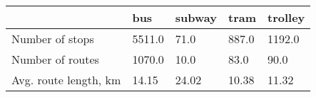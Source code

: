 \begin{tabular}{lllll}
\toprule
{} &     bus & subway &   tram & trolley \\
\midrule
Number of stops       &  5511.0 &   71.0 &  887.0 &  1192.0 \\
Number of routes      &  1070.0 &   10.0 &   83.0 &    90.0 \\
Avg. route length, km &   14.15 &  24.02 &  10.38 &   11.32 \\
\bottomrule
\end{tabular}

